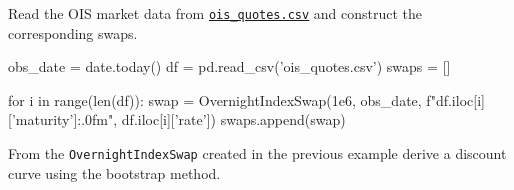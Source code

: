 \begin{question}
Read the OIS market data from \href{https://raw.githubusercontent.com/matteosan1/finance_course/master/input_files/ois_quotes.csv}{\texttt{ois\_quotes.csv}} and construct the corresponding swaps.
\end{question}

\cprotEnv\begin{solution}

\begin{ipython}
obs_date = date.today()
df = pd.read_csv('ois_quotes.csv')
swaps = []

for i in range(len(df)):
    swap = OvernightIndexSwap(1e6, obs_date,
                              f"{df.iloc[i]['maturity']:.0f}m",
                              df.iloc[i]['rate'])
    swaps.append(swap)
\end{ipython}
\end{solution}

\begin{question}
From the \texttt{OvernightIndexSwap} created in the previous example derive a discount curve using the bootstrap method.
\end{question}

